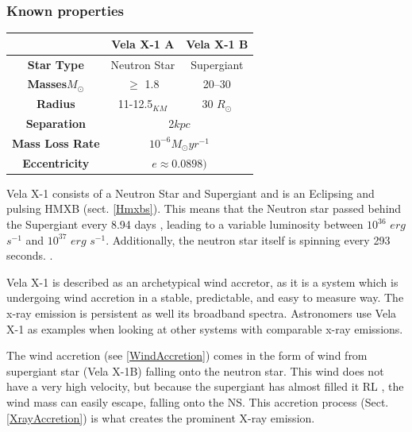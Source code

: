 \documentclass[12pt, letterpaper]{article}
\begin{document}
        \subsubsection{Known properties}
        \begin{center}
            \begin{tabular}{||c | c  c||} 
             \hline
             & Vela X-1 A & Vela X-1 B  \\ 
             \hline\hline
             \textbf{Star Type} & Neutron Star & Supergiant \cite{Kretschmar_2021} \\ 
             \hline
             \textbf{Masses}\(M_\odot\) & $\ge$ 1.8 \cite{Kretschmar_2021} & 20–30 \cite{Kretschmar_2021} \\
             \hline
             \textbf{Radius} & 11-12.5$_{KM}$ \cite{Kretschmar_2021} & 30 \(R_\odot\)
             \cite{Kretschmar_2021} \\ %
             \hline 
             \textbf{Separation} &  \multicolumn{2}{c||}{2$kpc$ \cite{Kretschmar_2021}} \\
             \hline 
             \textbf{Mass Loss Rate} & \multicolumn{2}{c||}{$10^{-6} M_\odot yr^{-1}$ \cite{Kretschmar_2021}} \\
             \hline
             \textbf{Eccentricity} & \multicolumn{2}{c||}{$ e \approx  0.0898)$ \cite{Kretschmar_2021}} \\
             \hline
            \end{tabular}

        \end{center}
        Vela X-1 consists of a Neutron Star and Supergiant and is an Eclipsing and pulsing HMXB (sect. \ref{Hmxbs}). This means that the Neutron star passed behind the Supergiant every 8.94 days \cite{Falanga_2015}, leading to a variable luminosity between $10^{36}$ $erg$ $s^{-1}$ and $10^{37}$ $erg$ $s^{-1}$. Additionally, the neutron star itself is spinning every 293 seconds. \cite{Kretschmar_2021}. 
        
        Vela X-1 is described as an archetypical wind accretor, as it is a system which is undergoing wind accretion in a stable, predictable, and easy to measure way. The x-ray emission is persistent as well its broadband spectra. Astronomers use Vela X-1 as examples when looking at other systems with comparable x-ray emissions. \cite{Kretschmar_2021}
        
        The wind accretion (see \ref{WindAccretion}) comes in the form of wind from supergiant star (Vela X-1B) falling onto the neutron star. This wind does not have a very high velocity, but because the supergiant has almost filled it RL \cite{Kretschmar_2021}, the wind mass can easily escape, falling onto the NS. This accretion process (Sect. \ref{XrayAccretion}) is what creates the prominent X-ray emission.
\end{document}
